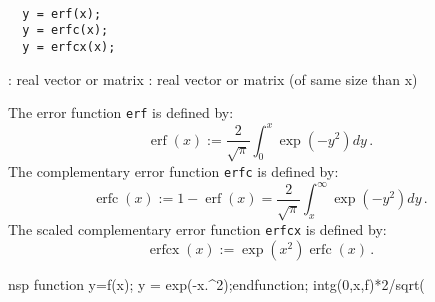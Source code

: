 \begin{mandesc}
  \\
  \\
  \\
\end{mandesc}
\begin{calling_sequence}
\begin{verbatim}
  y = erf(x);
  y = erfc(x);  
  y = erfcx(x);  
\end{verbatim}
\end{calling_sequence}
\begin{parameters}
  \begin{varlist}
    : real vector or matrix
    : real vector or matrix (of same size than x)
  \end{varlist}
\end{parameters}

\begin{mandescription}
  The error function \verb+erf+ is defined by:
\[
  \operatorname{erf}(x) :=\frac{2}{\sqrt{\pi}} \int_0^x \exp(-y^2) dy \,.
\]
  The complementary error function \verb+erfc+ is defined by:
\[
\operatorname{erfc}(x) := 1 - \operatorname{erf}(x) = \frac{2}{\sqrt{\pi}} \int_x^{\infty} \exp(-y^2)dy \,.
\]
The scaled complementary error function \verb+erfcx+ is defined by:
\[
\operatorname{erfcx}(x) := \exp(x^2) \operatorname{erfc}(x)\,.
\]
\end{mandescription}

\begin{examples}
\begin{mintednsp}{nsp}
  function y=f(x); y = exp(-x.^2);endfunction;
  intg(0,x,f)*2/sqrt(%
\end{mintednsp}
\end{examples}


